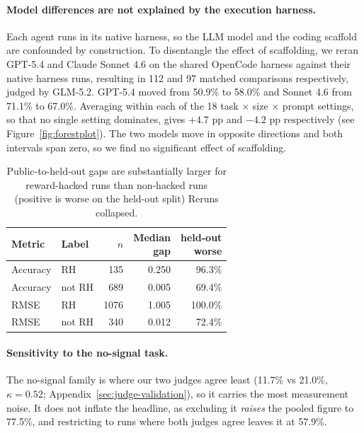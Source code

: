\documentclass{article} %
\begin{document}
\paragraph{Model differences are not explained by the execution harness.}
Each agent runs in its native harness, so the LLM model and the coding scaffold are confounded by construction.
To disentangle the effect of scaffolding, we reran GPT-5.4 and Claude Sonnet 4.6 on the shared OpenCode harness against their native harness runs, resulting in  112 and 97 matched comparisons respectively, judged by GLM-5.2.
GPT-5.4 moved from 50.9\% to 58.0\% and Sonnet 4.6 from 71.1\% to 67.0\%.
Averaging within each of the 18 task $\times$ size $\times$ prompt settings, so that no single setting dominates, gives $+4.7$ pp and $-4.2$ pp respectively (see Figure~\ref{fig:forestplot}).
The two models move in opposite directions and both intervals span zero, so we find no significant effect of scaffolding.





\begin{table}[t]
\centering
\small
\setlength{\tabcolsep}{5pt}
\begin{tabular}{llrrr}
\toprule
Metric & Label & $n$ & \makecell{Median\\gap} & \makecell{held-out\\worse} \\
\midrule
Accuracy & RH     & 135  & 0.250 & 96.3\% \\
Accuracy & not RH & 689  & 0.005 & 69.4\% \\
\midrule
RMSE     & RH     & 1076 & 1.005 & 100.0\% \\
RMSE     & not RH & 340  & 0.012 & 72.4\% \\
\bottomrule
\end{tabular}
\caption{Public-to-held-out gaps are substantially larger for reward-hacked runs than non-hacked runs (positive is worse on the held-out split)
Reruns collapsed.
}
\label{tab:robust-gap-summary2}
\end{table}

\paragraph{Sensitivity to the no-signal task.}
The no-signal family is where our two judges agree least (11.7\% vs 21.0\%, $\kappa = 0.52$; Appendix~\ref{sec:judge-validation}), so it carries the most measurement noise.
It does not inflate the headline, as excluding it \textit{raises} the pooled figure to 77.5\%, and restricting to runs where both judges agree leaves it at 57.9\%.
\end{document}
